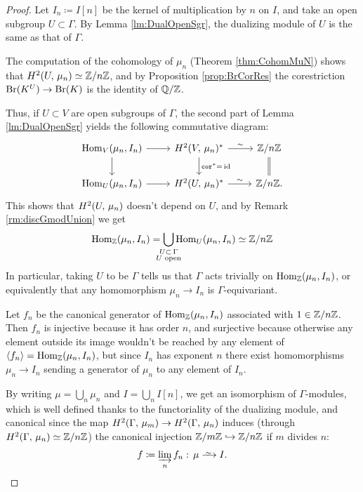 \documentclass[a4paper, oneside]{memoir}
\begin{document}
\begin{proof}
    Let $I_n\coloneqq I[n]$ be the kernel of multiplication by $n$ on $I$, and take an open subgroup $U\subset\Gamma$. By Lemma \ref{lm:DualOpenSgr}, the dualizing module of $U$ is the same as that of $\Gamma$.

    The computation of the cohomology of $\mu_n$ (Theorem \ref{thm:CohomMuN}) shows that \(H^{2}( U, \, \mu_n )\simeq\mathbb{Z}/n\mathbb{Z}\), and by Proposition \ref{prop:BrCorRes} the corestriction $\mathrm{Br}(K^U)\to\mathrm{Br}(K)$ is the identity of $\mathbb{Q}/\mathbb{Z}$.

    Thus, if $U\subset V$ are open subgroups of $\Gamma$, the second part of Lemma \ref{lm:DualOpenSgr} yields the following commutative diagram:
    \begin{equation}\label{eq:FuncDual}
        \begin{tikzcd}
            \Hom_V(\mu_n,I_n)
            \ar[d]
            \ar[r] &
            \H{2}{V}{\mu_n}^*
            \ar[d, "\Cor^*=\,\id"]
            \rar["\sim"] &
            \Zn
            \ar[equal, d] \\
            \Hom_U(\mu_n,I_n)
            \ar[r] &
            \H{2}{U}{\mu_n}^*
            \rar["\sim"] &
            \Zn.
        \end{tikzcd}
    \end{equation}
    This shows that \(H^{2}( U, \, \mu_n )\) doesn't depend on \(U\), and by Remark \ref{rm:discGmodUnion} we get
    \[
        \Hom_\Z(\mu_n,I_n)=\bigcup_{\mathclap{\substack{U\subset\,\Gamma\\U\text{ open}}}}{\Hom_U(\mu_n,I_n)}\simeq\Zn
    \]
    In particular, taking $U$ to be $\Gamma$ tells us that $\Gamma$ acts trivially on $\operatorname{Hom}_{\mathbb{Z}}(\mu_n,I_n)$, or equivalently that any homomorphism $\mu_n\to I_n$ is $\Gamma$-equivariant.

    Let $f_n$ be the canonical generator of $\operatorname{Hom}_{\mathbb{Z}}(\mu_n,I_n)$ associated with $1\in\mathbb{Z}/n\mathbb{Z}$. Then $f_n$ is injective because it has order $n$, and surjective because otherwise any
    element outside its image wouldn't be reached by any element of $\langle f_n\rangle=\operatorname{Hom}_{\mathbb{Z}}(\mu_n,I_n)$, but since $I_n$ has exponent $n$ there exist homomorphisms $\mu_n\to I_n$ sending a generator of $\mu_n$ to any element of $I_n$.

    By writing $\mu = \bigcup_n{\mu_n}$ and $I = \bigcup_n{I[n]}$, we get an isomorphism of $\Gamma$-modules, which is well defined thanks to the functoriality of the dualizing
    module, and canonical since the map $H^{2}( \Gamma, \, \mu_m )\to H^{2}( \Gamma, \, \mu_n )$ induces (through $H^{2}( \Gamma, \, \mu_n )\simeq\mathbb{Z}/n\mathbb{Z}$) the canonical injection $\mathbb{Z}/m\mathbb{Z}\hookrightarrow\mathbb{Z}/n\mathbb{Z}$ if $m$ divides $n$:
    \[
        f\coloneqq \varinjlim_n f_n:\, \mu\Iso I.
    \]
\end{proof}
\end{document}
